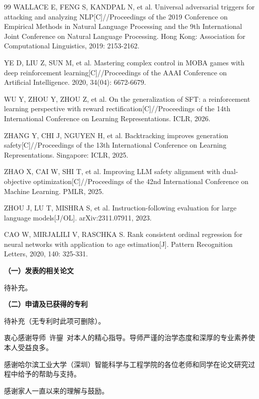 \documentclass[fontset=fandol,type=master,campus=shenzhen,etitleauto=true]{hithesisbook}
\begin{document}
\begin{thebibliography}{99}
 WALLACE E, FENG S, KANDPAL N, et al. Universal adversarial triggers for attacking and analyzing NLP[C]//Proceedings of the 2019 Conference on Empirical Methods in Natural Language Processing and the 9th International Joint Conference on Natural Language Processing. Hong Kong: Association for Computational Linguistics, 2019: 2153-2162.

 YE D, LIU Z, SUN M, et al. Mastering complex control in MOBA games with deep reinforcement learning[C]//Proceedings of the AAAI Conference on Artificial Intelligence. 2020, 34(04): 6672-6679.

 WU Y, ZHOU Y, ZHOU Z, et al. On the generalization of SFT: a reinforcement learning perspective with reward rectification[C]//Proceedings of the 14th International Conference on Learning Representations. ICLR, 2026.

 ZHANG Y, CHI J, NGUYEN H, et al. Backtracking improves generation safety[C]//Proceedings of the 13th International Conference on Learning Representations. Singapore: ICLR, 2025.

 ZHAO X, CAI W, SHI T, et al. Improving LLM safety alignment with dual-objective optimization[C]//Proceedings of the 42nd International Conference on Machine Learning. PMLR, 2025.

 ZHOU J, LU T, MISHRA S, et al. Instruction-following evaluation for large language models[J/OL]. arXiv:2311.07911, 2023.

 CAO W, MIRJALILI V, RASCHKA S. Rank consistent ordinal regression for neural networks with application to age estimation[J]. Pattern Recognition Letters, 2020, 140: 325-331.

\end{thebibliography}

\begin{publication}
\noindent\textbf{（一）发表的相关论文}
\begin{publist}
\item 待补充。
\end{publist}

\noindent\textbf{（二）申请及已获得的专利}
\begin{publist}
\item 待补充（无专利时此项可删除）。
\end{publist}
\end{publication}

\authorization

\begin{acknowledgements}
衷心感谢导师~许鋆~对本人的精心指导。导师严谨的治学态度和深厚的专业素养使本人受益良多。

感谢哈尔滨工业大学（深圳）智能科学与工程学院的各位老师和同学在论文研究过程中给予的帮助与支持。

感谢家人一直以来的理解与鼓励。
\end{acknowledgements}
\end{document}
